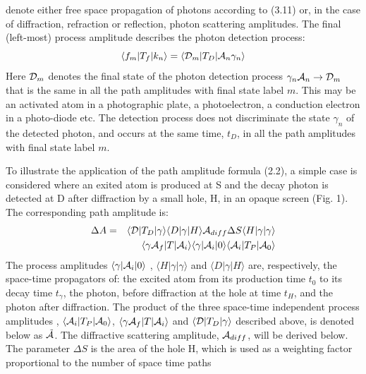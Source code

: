 \documentclass [12pt]{article}
\begin{document}
{  denote either free space propagation of photons according to (3.11) or, in the case of
  diffraction, refraction or reflection, photon scattering amplitudes. The final (left-most)
  process amplitude describes the photon detection process:
   \begin{equation}
  \langle f_m|T_f|k_{n}\rangle =  \langle {\cal D}_m|T_D| {\cal A}_n \gamma_n \rangle 
  \end{equation}
   Here ${\cal D}_m$ denotes the final state of the photon detection process
   $\gamma_n {\cal A}_n \rightarrow {\cal D}_m$ that is the same in all the path amplitudes
   with final state label $m$. This may be an activated atom in a photographic plate,
   a photoelectron, a conduction electron in a photo-diode etc. The detection process
   does not discriminate the state $\gamma_n$ of the detected photon, and 
   occurs at the same time, $t_D$, in all the path amplitudes with final state 
   label $m$.
   \par To illustrate the application of the path amplitude formula (2.2), a simple case
    is considered where an exited atom is produced at S and the decay photon is detected at D after
    diffraction by a small hole, H, in an opaque screen (Fig. 1). The corresponding 
    path amplitude is:
   \begin{eqnarray}
   \Delta A & = & \langle {\cal D}|T_D| \gamma \rangle
               \langle D|\gamma|H\rangle {\cal A}_{diff}\Delta S
              \langle H|\gamma|\gamma\rangle \nonumber \\
           &   &    \langle \gamma  {\cal A}_f|T| {\cal A}_i\rangle
                \langle\gamma |{\cal A}_i| 0\rangle 
                \langle {\cal A}_i|T_P|{\cal A}_0 \rangle
     \end{eqnarray}
 The process amplitudes $\langle\gamma |{\cal A}_i|0 \rangle$ , 
 $\langle H|\gamma|\gamma \rangle$ and 
 $\langle D|\gamma|H \rangle$ are, respectively, the space-time
  propagators of: the excited atom from its production time $t_0$
  to its decay time $t_{\gamma}$, the photon, before diffraction at the hole at time $t_H$,
  and the photon
  after diffraction. The product of the three space-time independent process
 amplitudes , $\langle {\cal A}_i|T_P|{\cal A}_0 \rangle$, $\langle \gamma  {\cal A}_f|T| {\cal A}_i\rangle$
  and $\langle {\cal D}|T_D| \gamma \rangle$ described above, is denoted below as $\tilde{{\cal A}}$.
   The diffractive scattering
  amplitude, $ {\cal A}_{diff}$, will be derived below. The parameter $\Delta S$ is the area of the hole 
  H, which is used as a weighting factor proportional to the number of space time paths 
}
\end{document}
